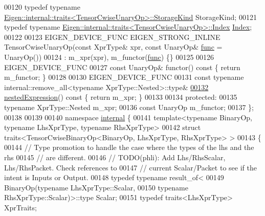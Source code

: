 \begin{DoxyCode}
00120     \textcolor{keyword}{typedef} \textcolor{keyword}{typename} \hyperlink{struct_eigen_1_1internal_1_1traits}{Eigen::internal::traits<TensorCwiseUnaryOp>::StorageKind}
       StorageKind;
00121     \textcolor{keyword}{typedef} \textcolor{keyword}{typename} \hyperlink{struct_eigen_1_1internal_1_1traits}{Eigen::internal::traits<TensorCwiseUnaryOp>::Index}
       \hyperlink{namespace_eigen_a62e77e0933482dafde8fe197d9a2cfde}{Index};
00122 
00123     EIGEN\_DEVICE\_FUNC EIGEN\_STRONG\_INLINE TensorCwiseUnaryOp(\textcolor{keyword}{const} XprType& xpr, \textcolor{keyword}{const} UnaryOp& 
      \hyperlink{structfunc}{func} = UnaryOp())
00124       : m\_xpr(xpr), m\_functor(\hyperlink{structfunc}{func}) \{\}
00125 
00126     EIGEN\_DEVICE\_FUNC
00127     \textcolor{keyword}{const} UnaryOp& functor()\textcolor{keyword}{ const }\{ \textcolor{keywordflow}{return} m\_functor; \}
00128 
00130     EIGEN\_DEVICE\_FUNC
00131     \textcolor{keyword}{const} \textcolor{keyword}{typename} internal::remove\_all<typename XprType::Nested>::type&
\hyperlink{class_eigen_1_1_tensor_cwise_unary_op_af3a260b2117072817e641d72038cce51}{00132}     \hyperlink{class_eigen_1_1_tensor_cwise_unary_op_af3a260b2117072817e641d72038cce51}{nestedExpression}()\textcolor{keyword}{ const }\{ \textcolor{keywordflow}{return} m\_xpr; \}
00133 
00134   \textcolor{keyword}{protected}:
00135     \textcolor{keyword}{typename} XprType::Nested m\_xpr;
00136     \textcolor{keyword}{const} UnaryOp m\_functor;
00137 \};
00138 
00139 
00140 \textcolor{keyword}{namespace }\hyperlink{namespaceinternal}{internal} \{
00141 \textcolor{keyword}{template}<\textcolor{keyword}{typename} BinaryOp, \textcolor{keyword}{typename} LhsXprType, \textcolor{keyword}{typename} RhsXprType>
00142 \textcolor{keyword}{struct }traits<TensorCwiseBinaryOp<BinaryOp, LhsXprType, RhsXprType> >
00143 \{
00144   \textcolor{comment}{// Type promotion to handle the case where the types of the lhs and the rhs}
00145   \textcolor{comment}{// are different.}
00146   \textcolor{comment}{// TODO(phli): Add Lhs/RhsScalar, Lhs/RhsPacket.  Check references to}
00147   \textcolor{comment}{// current Scalar/Packet to see if the intent is Inputs or Output.}
00148   \textcolor{keyword}{typedef} \textcolor{keyword}{typename} result\_of<
00149       BinaryOp(\textcolor{keyword}{typename} LhsXprType::Scalar,
00150                \textcolor{keyword}{typename} RhsXprType::Scalar)>::type Scalar;
00151   \textcolor{keyword}{typedef} traits<LhsXprType> XprTraits;

\end{DoxyCode}
